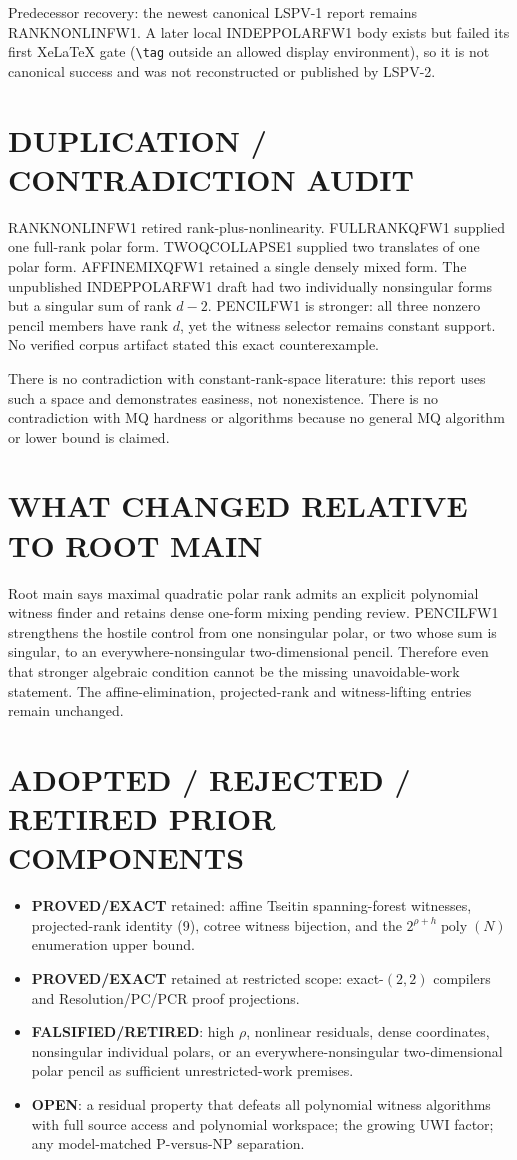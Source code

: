 \documentclass[11pt]{article}
\newcommand{\EXACT}{\textbf{PROVED/EXACT}}
\newcommand{\OPEN}{\textbf{OPEN}}
\newcommand{\RET}{\textbf{FALSIFIED/RETIRED}}
\begin{document}
Predecessor recovery: the newest canonical LSPV-1 report remains
RANKNONLINFW1.  A later local INDEPPOLARFW1 body exists but failed its first
XeLaTeX gate (\verb|\tag| outside an allowed display environment), so it is
not canonical success and was not reconstructed or published by LSPV-2.

\section{DUPLICATION / CONTRADICTION AUDIT}
RANKNONLINFW1 retired rank-plus-nonlinearity.  FULLRANKQFW1 supplied one
full-rank polar form.  TWOQCOLLAPSE1 supplied two translates of one polar
form.  AFFINEMIXQFW1 retained a single densely mixed form.  The unpublished
INDEPPOLARFW1 draft had two individually nonsingular forms but a singular
sum of rank \(d-2\).  PENCILFW1 is stronger: all three nonzero pencil members
have rank \(d\), yet the witness selector remains constant support.  No
verified corpus artifact stated this exact counterexample.

There is no contradiction with constant-rank-space literature: this report
uses such a space and demonstrates easiness, not nonexistence.  There is no
contradiction with MQ hardness or algorithms because no general MQ algorithm
or lower bound is claimed.

\section{WHAT CHANGED RELATIVE TO ROOT MAIN}
Root main says maximal quadratic polar rank admits an explicit polynomial
witness finder and retains dense one-form mixing pending review.  PENCILFW1
strengthens the hostile control from one nonsingular polar, or two whose sum
is singular, to an everywhere-nonsingular two-dimensional pencil.  Therefore
even that stronger algebraic condition cannot be the missing
unavoidable-work statement.  The affine-elimination, projected-rank and
witness-lifting entries remain unchanged.

\section{ADOPTED / REJECTED / RETIRED PRIOR COMPONENTS}
\begin{itemize}
\item \EXACT{} retained: affine Tseitin spanning-forest witnesses,
  projected-rank identity (9), cotree witness bijection, and the
  \(2^{\rho+h}\operatorname{poly}(N)\) enumeration upper bound.
\item \EXACT{} retained at restricted scope: exact-\((2,2)\) compilers and
  Resolution/PC/PCR proof projections.
\item \RET{}: high \(\rho\), nonlinear residuals, dense coordinates,
  nonsingular individual polars, or an everywhere-nonsingular
  two-dimensional polar pencil as sufficient unrestricted-work premises.
\item \OPEN{}: a residual property that defeats all polynomial witness
  algorithms with full source access and polynomial workspace; the growing
  UWI factor; any model-matched P-versus-NP separation.
\end{itemize}
\end{document}
